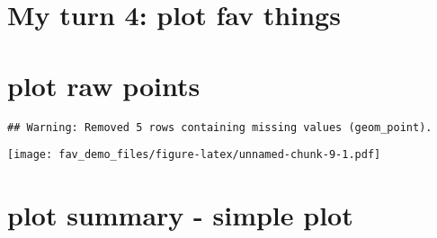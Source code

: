 \documentclass[]{article}
\newenvironment{Shaded}{\begin{snugshade}}{\end{snugshade}}
\newcommand{\DataTypeTok}[1]{\textcolor[rgb]{0.13,0.29,0.53}{#1}}
\newcommand{\KeywordTok}[1]{\textcolor[rgb]{0.13,0.29,0.53}{\textbf{#1}}}
\newcommand{\NormalTok}[1]{#1}
\newcommand{\OperatorTok}[1]{\textcolor[rgb]{0.81,0.36,0.00}{\textbf{#1}}}
\newcommand{\OtherTok}[1]{\textcolor[rgb]{0.56,0.35,0.01}{#1}}
\newcommand{\StringTok}[1]{\textcolor[rgb]{0.31,0.60,0.02}{#1}}
\begin{document}
\begin{Shaded}
\end{Shaded}

\hypertarget{my-turn-4-plot-fav-things}{%
\section{My turn 4: plot fav things}\label{my-turn-4-plot-fav-things}}

\hypertarget{plot-raw-points}{%
\section{plot raw points}\label{plot-raw-points}}

\begin{Shaded}
\end{Shaded}

\begin{verbatim}
## Warning: Removed 5 rows containing missing values (geom_point).
\end{verbatim}

\texttt{[image: fav\_demo\_files/figure-latex/unnamed-chunk-9-1.pdf]}

\hypertarget{plot-summary---simple-plot}{%
\section{plot summary - simple plot}\label{plot-summary---simple-plot}}
\end{document}
